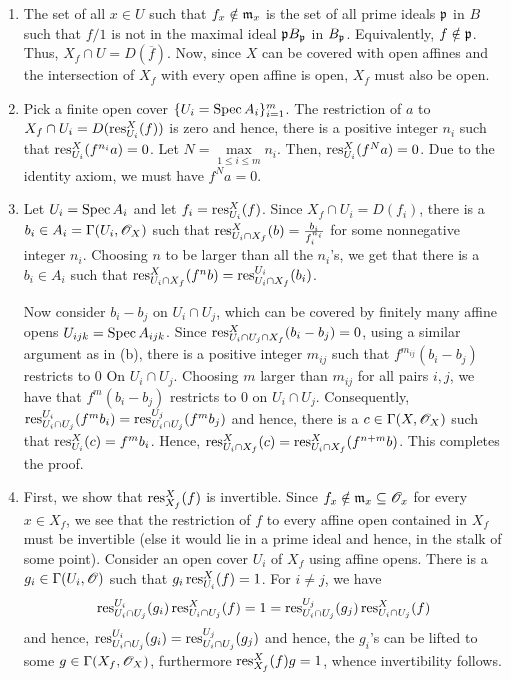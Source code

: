 \setcounter{exercise}{15}
\begin{exercise}\hfill %
\begin{enumerate}[label=(\alph*)]
\item The set of all $x\in U$ such that $f_x\notin\mathfrak{m}_x$ is the set of all prime ideals $\mathfrak{p}$ in $B$ such that $f/1$ is not in the maximal ideal $\mathfrak{p} B_{\mathfrak{p}}$ in $B_{\mathfrak{p}}$. Equivalently, $f\notin\mathfrak{p}$. Thus, $X_f\cap U = D(\overline f)$. Now, since $X$ can be covered with open affines and the intersection of $X_f$ with every open affine is open, $X_f$ must also be open.

\item Pick a finite open cover $\{U_i = \operatorname{Spec} A_i\}_{i = 1}^m$. The restriction of $a$ to $X_f\cap U_i = D(\operatorname{res}^X_{U_i}(f))$ is zero and hence, there is a positive integer $n_i$ such that $\operatorname{res}^X_{U_i}(f^{n_i}a) = 0$. Let $N = \max\limits_{1\le i\le m} n_i$. Then, $\operatorname{res}^X_{U_i}(f^Na) = 0$. Due to the identity axiom, we must have $f^Na = 0$.

\item Let $U_i = \operatorname{Spec} A_i$ and let $f_i = \operatorname{res}^{X}_{U_i}(f)$. Since $X_f\cap U_i = D(f_i)$, there is a $b_i\in A_i = \Gamma(U_i,\mathscr{O}_X)$ such that $\operatorname{res}^X_{U_i\cap X_f}(b) = \frac{b_i}{f_i^{n_i}}$ for some nonnegative integer $n_i$. Choosing $n$ to be larger than all the $n_i$'s, we get that there is a $b_i\in A_i$ such that $\operatorname{res}^{X}_{U_i\cap X_f}(f^nb) = \operatorname{res}^{U_i}_{U_i\cap X_f}(b_i)$.

Now consider $b_i - b_j$ on $U_i\cap U_j$, which can be covered by finitely many affine opens $U_{ijk} = \operatorname{Spec} A_{ijk}$. Since $\operatorname{res}^{X}_{U_i\cap U_j\cap X_f}(b_i - b_j) = 0$, using a similar argument as in (b), there is a positive integer $m_{ij}$ such that $f^{m_{ij}}(b_i - b_j)$ restricts to $0$ On $U_i\cap U_j$. Choosing $m$ larger than $m_{ij}$ for all pairs $i,j$, we have that $f^m(b_i - b_j)$ restricts to $0$ on $U_i\cap U_j$. Consequently, $\operatorname{res}^{U_i}_{U_i\cap U_j}(f^mb_i) = \operatorname{res}^{U_j}_{U_i\cap U_j}(f^mb_j)$ and hence, there is a $c\in\Gamma(X,\mathscr{O}_X)$ such that $\operatorname{res}^{X}_{U_i}(c) = f^mb_i$. Hence, $\operatorname{res}^X_{U_i\cap X_f}(c) = \operatorname{res}^X_{U_i\cap X_f}(f^{n + m}b)$. This completes the proof.

\item First, we show that $\operatorname{res}^X_{X_f}(f)$ is invertible. Since $f_x\notin\mathfrak{m}_x\subseteq\mathscr{O}_x$ for every $x\in X_f$, we see that the restriction of $f$ to every affine open contained in $X_f$ must be invertible (else it would lie in a prime ideal and hence, in the stalk of some point). Consider an open cover $U_i$ of $X_f$ using affine opens. There is a $g_i\in\Gamma(U_i,\mathscr{O})$ such that $g_i\operatorname{res}^X_{U_i}(f) = 1$. For $i\ne j$, we have 
\begin{equation*}
    \operatorname{res}^{U_i}_{U_i\cap U_j}(g_i)\operatorname{res}^X_{U_i\cap U_j}(f) = 1 = \operatorname{res}^{U_j}_{U_i\cap U_j}(g_j)\operatorname{res}^X_{U_i\cap U_j}(f)
\end{equation*}
and hence, $\operatorname{res}^{U_i}_{U_i\cap U_j}(g_i) = \operatorname{res}^{U_j}_{U_i\cap U_j}(g_j)$ and hence, the $g_i$'s can be lifted to some $g\in\Gamma(X_f,\mathscr{O}_X)$, furthermore $\operatorname{res}^X_{X_f}(f)g = 1$, whence invertibility follows.


\end{enumerate}
\end{exercise}
